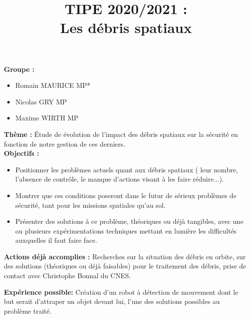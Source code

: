 \documentclass[a4paper,1pt]{article}
\title{TIPE 2020/2021 : \\ Les débris spatiaux}
\date{}
\begin{document}
\maketitle

\textbf{Groupe :}

\begin{itemize}
\item Romain MAURICE MP*

\item Nicolas GRY MP 

\item Maxime WIRTH MP
\end{itemize}
\vspace{1em}

\textbf{Thème :} Étude de évolution de l'impact des débris spatiaux sur la sécurité en fonction de notre gestion de ces derniers.\\


\textbf{Objectifs :}

\begin{itemize}
\item Positionner les problèmes actuels quant aux débris spatiaux ( leur nombre, l'absence de contrôle, le manque d'actions visant à les faire réduire...).

\item Montrer que ces conditions poseront dans le futur de sérieux problèmes de sécurité, tant pour les missions spatiales qu'au sol.

\item Présenter des solutions à ce problème, théoriques ou déjà tangibles, avec une ou plusieurs expérimentations techniques mettant en lumière les difficultés auxquelles il faut faire face.
\end{itemize}
\vspace{1em}

\textbf{Actions déjà accomplies :}
Recherches sur la situation des débris en orbite, sur des solutions (théoriques ou déjà faisables) pour le traitement des débris, prise de contact avec Christophe Bonnal du CNES.
\vspace{1em}

\textbf{Expérience possible:} Création d'un robot à détection de mouvement dont le but serait d'attraper un objet devant lui, l'une des solutions possibles au problème traité.
\end{document}
